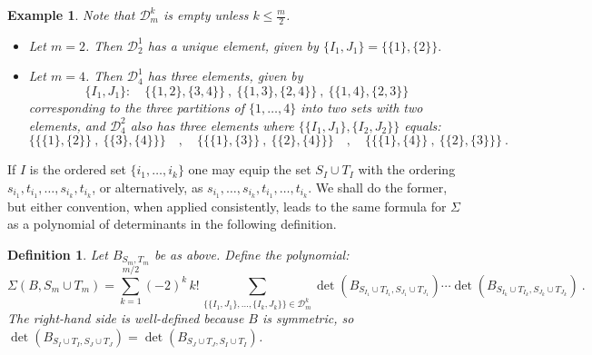 \documentclass[10pt]{amsart}
\theoremstyle{plain}
\newtheorem{defn}[thm]{Definition}
\newtheorem{ex}[thm]{Example}
\newcommand{\0}{\color{blue}{\mathsf{0}}}
\begin{document}
\begin{ex} \label{examplesofDk} Note that $\mathcal{D}^k_{m}$ is empty unless $k\leq\frac{m}2$. 
\begin{itemize} 
\item Let $m=2$.  Then  $\mathcal{D}^1_2$ has a unique element, given by $\{I_1,J_1\}= \{\{1\},\{2\}\}.$
\item Let  $m=4$.  Then  $\mathcal{D}^1_4$ has three elements, given by 
\[ \{I_1,J_1\} :   \quad  \{\{1,2\}, \{3,4\}\} \ , \  \{\{1,3\}, \{2,4\}\} \ , \  \{\{1,4\}, \{2,3\}\}  \]
corresponding to the three partitions of $\{1,\ldots, 4\}$ into two sets with two elements, and $\mathcal{D}^2_4$ also has three elements where $ \{ \{I_1,J_1\}  , \{I_2,J_2\} \}$  equals:
\[     \{   \{\{1\}, \{2\}\}   \  , \  \{\{3\}, \{4\}\}  \}    \quad , \quad     \{   \{\{1\}, \{3\}\}   \ , \ \{\{2\}, \{4\}\}  \}  \quad , \quad   \{   \{\{1\}, \{4\}\}   \ , \ \{\{2\}, \{3\}\}  \}\ .   \]
   \end{itemize}  
\end{ex}


If $I$ is the ordered set $\{i_1,\ldots, i_k\} $ one  may  equip the set $S_I \cup T_I$ with the ordering $s_{i_1}, t_{i_1}, \ldots, s_{i_k}, t_{i_k} $, or alternatively, as  $s_{i_1},\ldots, s_{i_k}, t_{i_1}, \ldots, t_{i_k}$. We shall do the former, but either convention, when applied consistently, leads to the same formula for $\Sigma$ as a polynomial of determinants in the following definition.

\begin{defn}\label{defn: Sigma} Let $B_{S_{m},T_{m}}$ be as above. Define the polynomial:
\begin{equation}\label{eq: Sigma}
\Sigma(B,S_{m}\cup T_{m}) = \sum_{k=1}^{m/2}   (-2)^k\,  k! \,     \sum_{  \{\{I_1,J_1\} , \ldots, \{ I_k, J_k\} \} \in \mathcal{D}^k_{m}  } 
\det(B_{S_{I_1}\cup T_{I_1}, S_{J_1}\cup T_{J_1} })   \cdots \det(B_{S_{I_k}\cup T_{I_k}, S_{J_k}\cup T_{J_k} })   \ . 
\end{equation}
The right-hand side is well-defined because $B$ is symmetric, so $\det(B_{S_I\cup T_I,S_J\cup T_J}) = \det(B_{S_J\cup T_J,S_I\cup T_I}) $.  
\end{defn}
\end{document}
